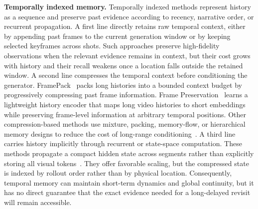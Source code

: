 \textbf{Temporally indexed memory.}
Temporally indexed methods represent history as a sequence and preserve past evidence according to recency, narrative order, or recurrent propagation.
A first line directly retains raw temporal context, either by appending past frames to the current generation window or by keeping selected keyframes across shots.
Such approaches preserve high-fidelity observations when the relevant evidence remains in context, but their cost grows with history and their recall weakens once a location falls outside the retained window.
A second line compresses the temporal context before conditioning the generator.
FramePack~\cite{zhang2025framepack} packs long histories into a bounded context budget by progressively compressing past frame information.
Frame Preservation~\cite{zhang2025framepreservation} learns a lightweight history encoder that maps long video histories to short embeddings while preserving frame-level information at arbitrary temporal positions.
Other compression-based methods use mixture, packing, memory-flow, or hierarchical memory designs to reduce the cost of long-range conditioning~\cite{zhang2025framepack,zhang2025framepreservation,wu2026infiniteworld}.
A third line carries history implicitly through recurrent or state-space computation.
These methods propagate a compact hidden state across segments rather than explicitly storing all visual tokens~\cite{chen2025recurrentdiffusion,po2025longcontextssm,yu2025videossm}.
They offer favorable scaling, but the compressed state is indexed by rollout order rather than by physical location.
Consequently, temporal memory can maintain short-term dynamics and global continuity, but it has no direct guarantee that the exact evidence needed for a long-delayed revisit will remain accessible.

